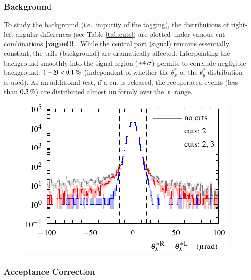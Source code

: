
\subsubsection{Background}
\label{sec:background}

To study the background (i.e.~impurity of the tagging), the distributions of right-left angular differences (see Table \ref{tab:cuts}) are plotted under various cut combinations \textbf{[vague!!!]}. While the central part (signal) remains essentially constant, the tails (background) are dramatically affected. Interpolating the background smoothly into the signal region ($\pm 4\,{\rm \sigma}$) permits to conclude negligible background: $1 - {\cal B} < 0.1\un{\%}$ (independent of whether the $\theta_x^*$ or the $\theta_y^*$ distribution is used). As an additional test, if a cut is released, the recuperated events (less than $0.3\,{\rm \%}$) are distributed almost uniformly over the $|t|$ range.


\begin{figure}
\begin{center}
\includegraphics{fig/cut_distributions.pdf}
\caption{%
}
\label{fig:tag bckg}
\end{center}
\end{figure}


\subsubsection{Acceptance Correction}
\label{sec:acc corr}

